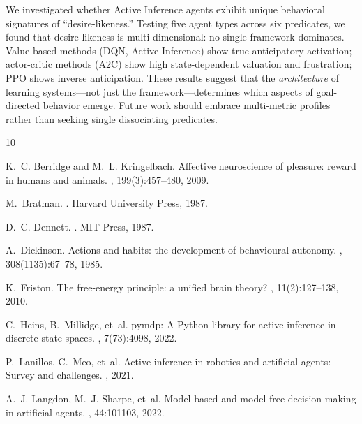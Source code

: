 \documentclass{article}
\begin{document}
We investigated whether Active Inference agents exhibit unique behavioral signatures of ``desire-likeness.'' Testing five agent types across six predicates, we found that desire-likeness is multi-dimensional: no single framework dominates. Value-based methods (DQN, Active Inference) show true anticipatory activation; actor-critic methods (A2C) show high state-dependent valuation and frustration; PPO shows inverse anticipation. These results suggest that the \textit{architecture} of learning systems---not just the framework---determines which aspects of goal-directed behavior emerge. Future work should embrace multi-metric profiles rather than seeking single dissociating predicates.


\begin{thebibliography}{10}

K.~C. Berridge and M.~L. Kringelbach.
\newblock Affective neuroscience of pleasure: reward in humans and animals.
, 199(3):457--480, 2009.

M.~Bratman.
.
\newblock Harvard University Press, 1987.

D.~C. Dennett.
.
\newblock MIT Press, 1987.

A.~Dickinson.
\newblock Actions and habits: the development of behavioural autonomy.
, 308(1135):67--78, 1985.

K.~Friston.
\newblock The free-energy principle: a unified brain theory?
, 11(2):127--138, 2010.

C.~Heins, B.~Millidge, et~al.
\newblock pymdp: A Python library for active inference in discrete state spaces.
, 7(73):4098, 2022.

P.~Lanillos, C.~Meo, et~al.
\newblock Active inference in robotics and artificial agents: Survey and challenges.
, 2021.

A.~J. Langdon, M.~J. Sharpe, et~al.
\newblock Model-based and model-free decision making in artificial agents.
, 44:101103, 2022.


\end{thebibliography}
\end{document}
